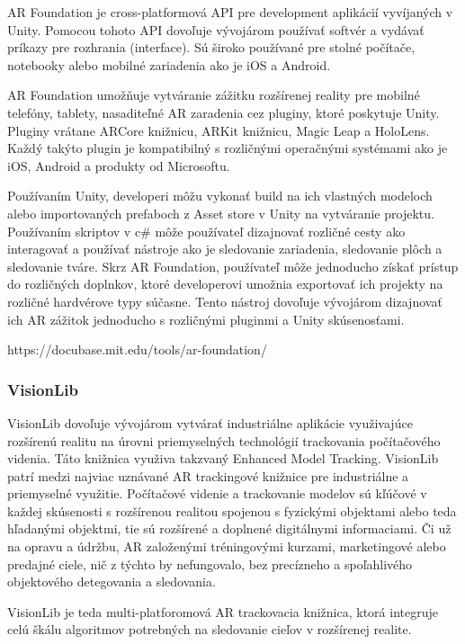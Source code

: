 AR Foundation je cross-platformová API pre development aplikácií vyvíjaných v Unity. Pomocou tohoto API dovoľuje vývojárom používať softvér a vydávať príkazy pre rozhrania (interface). Sú široko používané pre stolné počítače, notebooky alebo mobilné zariadenia ako je iOS a Android.

AR Foundation umožňuje vytváranie zážitku rozšírenej reality pre mobilné telefóny, tablety, nasaditeľné AR zaradenia cez pluginy, ktoré poskytuje Unity. Pluginy vrátane ARCore knižnicu, ARKit knižnicu, Magic Leap a HoloLens. Každý takýto plugin je kompatibilný s rozličnými operačnými systémami ako je iOS, Android a produkty od Microsoftu.

Používaním Unity, developeri môžu vykonať build na ich vlastných modeloch alebo importovaných prefaboch z Asset store v Unity na vytváranie projektu. Používaním skriptov v c\# môže používateľ dizajnovať rozličné cesty ako interagovať a používať nástroje ako je sledovanie zariadenia, sledovanie plôch a sledovanie tváre. Skrz AR Foundation, používateľ môže jednoducho získať prístup do rozličných doplnkov, ktoré developerovi umožnia exportovať ich projekty na rozličné hardvérove typy súčasne. Tento nástroj dovoľuje vývojárom dizajnovať ich AR zážitok jednoducho s rozličnými pluginmi a Unity skúsenosťami.

https://docubase.mit.edu/tools/ar-foundation/

\subsubsection{VisionLib}

VisionLib dovoľuje vývojárom vytvárať industriálne aplikácie využivajúce rozšírenú realitu na úrovni priemyselných technológií trackovania počítačového videnia. Táto knižnica využiva takzvaný Enhanced Model Tracking. VisionLib patrí medzi najviac uznávané AR trackingové knižnice pre industriálne a priemyselné využitie. Počítačové videnie a trackovanie modelov sú kľúčové v každej skúsenosti s rozšírenou realitou spojenou s fyzickými objektami alebo teda hľadanými objektmi, tie sú rozšírené a doplnené digitálnymi informaciami. Či už na opravu a údržbu, AR založenými tréningovými kurzami, marketingové alebo predajné ciele, nič z týchto by nefungovalo, bez precízneho a spoľahlivého objektového detegovania a sledovania.

VisionLib je teda multi-platforomová AR trackovacia knižnica, ktorá integruje celú škálu algoritmov potrebných na sledovanie cieľov v rozšírenej realite.  

